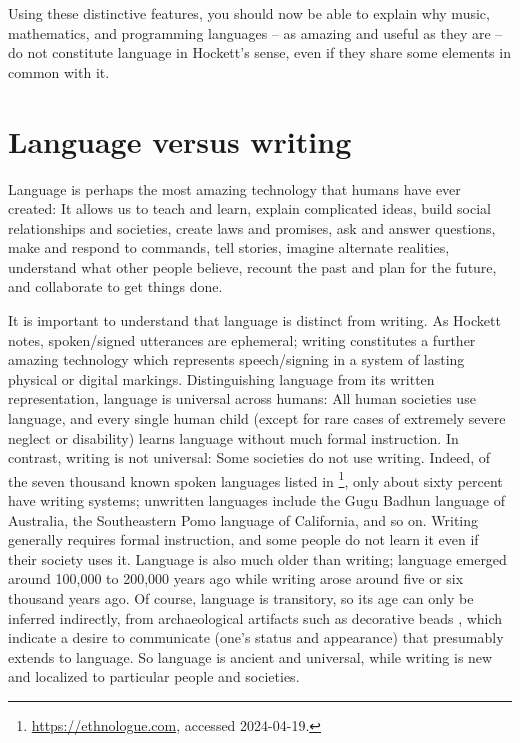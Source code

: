 \begin{enumerate}
\end{enumerate}

Using these distinctive features, you should now be able to explain why music, mathematics, and programming languages -- as amazing and useful as they are -- do not constitute language in Hockett's sense, even if they share some elements in common with it.

\section{Language versus writing}

Language is perhaps the most amazing technology that humans have ever created: It allows us to teach and learn,  explain complicated ideas,  build social relationships and societies,  create laws and promises,  ask and answer questions, make and respond to commands, tell stories, imagine alternate realities, understand what other people believe,  recount the past and plan for the future, and  collaborate to get things done.


It is important to understand that language is distinct from writing.  As Hockett notes, spoken/signed utterances are ephemeral; writing constitutes a further amazing technology which represents speech/signing in a system of lasting physical or digital markings.
 Distinguishing language from its written representation,  language is universal across humans: All human societies use language, and every single human child (except for rare cases of extremely severe neglect or disability) learns language without much formal instruction.  In contrast, writing is not universal: Some societies do not use writing.  Indeed, of the seven thousand known spoken languages listed in  \footnote{\url{https://ethnologue.com}, accessed 2024-04-19.}, only about sixty percent have writing systems; unwritten languages include the  Gugu Badhun language of Australia, the Southeastern Pomo language of California, and so on. 
Writing generally requires formal instruction, and some people do not learn it even if their society uses it.  Language is also much older than writing; language emerged around 100,000 to 200,000 years ago while writing arose around five or six thousand years ago.  Of course, language is transitory, so its age can only be inferred indirectly, from archaeological artifacts such as decorative beads \citep{BothaKnight:2009}, which indicate a desire to communicate (one's status and appearance) that presumably extends to language. So language is ancient and universal, while writing is new and localized to particular people and societies.

